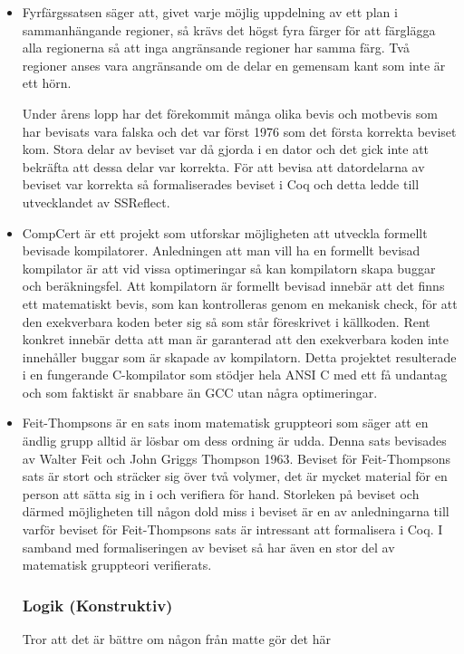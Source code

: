 \begin{itemize}

\item
Fyrfärgssatsen\autocite{gonthier2008formal} säger att, givet varje möjlig
uppdelning av ett plan i sammanhängande regioner, så krävs det högst fyra
färger för att färglägga alla regionerna så att inga angränsande regioner
har samma färg. Två regioner anses vara angränsande om de delar en
gemensam kant som inte är ett hörn.

Under årens lopp har det förekommit många olika bevis och motbevis som har
bevisats vara falska och  det var först 1976 som det första korrekta beviset
kom. Stora delar av beviset var då gjorda i en dator och det gick inte att
bekräfta att dessa delar var korrekta.
För att bevisa att datordelarna av beviset var korrekta så formaliserades
beviset i Coq och detta ledde till utvecklandet av SSReflect.

\item
CompCert\autocite{compcert} är ett projekt som utforskar möjligheten att
utveckla formellt bevisade kompilatorer. Anledningen att man vill ha en
formellt bevisad kompilator är att vid vissa optimeringar så kan kompilatorn
skapa buggar och beräkningsfel.
Att kompilatorn är formellt bevisad innebär att det finns ett matematiskt
bevis, som kan kontrolleras genom en mekanisk check, för att den exekverbara
koden beter sig så som står föreskrivet i källkoden. Rent konkret innebär detta
att man är garanterad att den exekverbara koden inte innehåller buggar som är
skapade av kompilatorn.
Detta projektet resulterade i en fungerande C-kompilator som stödjer hela ANSI
C med ett få undantag och som faktiskt är snabbare än GCC utan några
optimeringar.

\item
Feit-Thompsons är en sats inom matematisk gruppteori som säger att en ändlig
grupp alltid är lösbar om dess ordning är udda\cite{aschbacher2004status}.
Denna sats bevisades av Walter Feit och John Griggs Thompson 1963.
Beviset för Feit-Thompsons sats är stort och sträcker sig över två volymer, det
är mycket material för en person att sätta sig in i och verifiera för hand.
Storleken på beviset och därmed möjligheten till någon dold miss i beviset är
en av anledningarna till varför beviset för Feit-Thompsons sats är intressant
att formalisera i Coq.
I samband med formaliseringen av beviset så har även en stor del av matematisk
gruppteori verifierats.

\subsubsection{Logik (Konstruktiv)}
Tror att det är bättre om någon från matte gör det här


\end{itemize}
